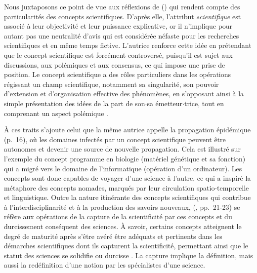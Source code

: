 \begin{description}
\medskip
Nous juxtaposons ce point de vue aux réflexions de \citeauthor{stengers1987d} (\citeyear{stengers1987d}) qui rendent compte des particularités des concepts scientifiques. D'après elle, l'attribut \textit{scientifique} est associé à leur objectivité et leur puissance explicative, or il n'implique pour autant pas une neutralité d'avis qui est considérée néfaste pour les recherches scientifiques et en même temps fictive. L'autrice renforce cette idée en prétendant que le concept scientifique est forcément controversé, puisqu'il est sujet aux discussions, aux polémiques et aux consensus, ce qui impose une prise de position. Le concept scientifique a des rôles particuliers dans les opérations régissant un champ scientifique, notamment sa singularité, son pouvoir d'extension et d'organisation effective des phénomènes, en s'opposant ainsi à la simple présentation des idées de la part de son$\cdot$sa émetteur$\cdot$trice, tout en comprenant un aspect polémique \citep[pp.~10-11]{stengers1987d}. 

À ces traits s'ajoute celui que la même autrice appelle \og{}la propagation épidémique\fg{} (p.~16), où les domaines \og{}infectés\fg{} par un concept scientifique peuvent être autonomes et devenir une source de nouvelle propagation. Cela est illustré sur l'exemple du concept \og programme \fg{} en biologie (matériel génétique et sa fonction) qui a migré vers le domaine de l'informatique (opération d'un ordinateur). Les concepts sont donc capables de voyager d'une science à l'autre, ce qui a inspiré la métaphore des \og{}concepts nomades\fg{}, marqués par leur circulation spatio-temporelle et linguistique. Outre la nature itinérante des concepts scientifiques qui contribue à l'interdisciplinarité et à la production des savoirs nouveaux, \citeauthor{stengers1987d} (\citeyear{stengers1987d}, pp.~21-23) se réfère aux opérations de la \og capture \fg{} de la scientificité par ces concepts et du \og durcissement \fg{} conséquent des sciences. À savoir, certains concepts atteignent le degré de maturité après s'être avéré être adéquats et pertinents dans les démarches scientifiques dont ils \og{}capturent\fg{} la scientificité, permettant ainsi que le statut des sciences se solidifie ou \og durcisse \fg{}. La capture implique la définition, mais aussi la redéfinition d'une notion par les spécialistes d'une science.


\end{description}
